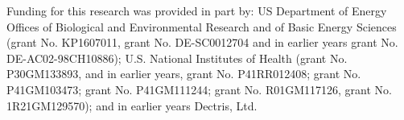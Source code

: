 \documentclass[preprint]{iucr}              %
\numberwithin{equation}{section}
\numberwithin{equation}{section}
\begin{document}
	
	Funding for this research was provided in part by:  
	US Department of Energy Offices of Biological and 
	Environmental Research and of Basic Energy Sciences 
	(grant No. KP1607011, grant No. DE-SC0012704 and in earlier years grant No. DE-AC02-98CH10886); 
	U.S. National Institutes of Health
	(grant No. P30GM133893, and in earlier years,
	grant No. P41RR012408; 
	grant No. P41GM103473; grant No. P41GM111244; 
	grant No. R01GM117126,
	grant No. 1R21GM129570); and in earlier years Dectris, Ltd.
	
	
	
	
	
	
	
	
	
	
	
	
	
	
\end{document}
